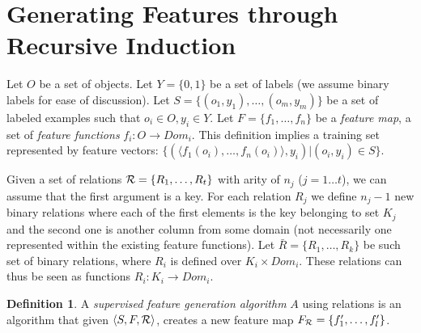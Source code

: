 \documentclass[twoside,11pt]{article}
\theoremstyle{definition}
\newtheorem{defn}{Definition}[section]
\begin{document}

\section{Generating Features through Recursive Induction}

Let $O$ be a set of objects. Let $Y=\{0,1\}$ be a set of labels (we assume binary labels for ease of discussion). Let $S=\{(o_{1},y_{1}),\ldots,(o_{m},y_{m})\}$ be a set of labeled examples such that $o_{i}\in O, y_{i}\in Y$. Let $F=\{f_{1},\ldots,f_{n}\}$ be a \emph{feature map}, a set of \emph{feature functions} $f_{i}:O\rightarrow Dom_{i}$.  This definition implies a training set represented by feature vectors: $\{ (\langle f_1(o_i),\ldots,f_n(o_i)\rangle, y_i) | (o_i,y_i) \in S\}$.

Given a set of relations ${\cal R}=\{R_{1},\ldots,R_{t}\}$ with arity of $n_{j}$ ($j=1\ldots t$), we can assume  that the first argument is a key. For each relation $R_{j}$ we define $n_{j}-1$ new binary relations where each of the first elements is the key belonging to set $K_{j}$ and the second one is another column from some domain (not necessarily one represented within the existing feature functions).
Let $\bar{R}=\{R_{1},\ldots,R_{k}\}$ be such set of binary relations, where $R_{i}$ is defined over $K_{i}\times Dom_{i}$. These relations can thus be seen as functions $R_{i}: K_{i}\rightarrow Dom_{i}$.

\begin{defn}
	A \emph{supervised feature generation algorithm} $A$ using relations is an algorithm that given $\langle S,F,{\cal R} \rangle$, creates a new feature map $F_{{\cal R}}=\{f'_{1},\ldots,f'_{l}\}$.
\end{defn}
\end{document}

